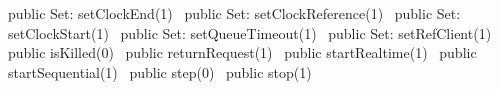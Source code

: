 public \LA{}Set: setClockEnd(1)~{\nwtagstyle{}}\RA{}
public \LA{}Set: setClockReference(1)~{\nwtagstyle{}}\RA{}
public \LA{}Set: setClockStart(1)~{\nwtagstyle{}}\RA{}
public \LA{}Set: setQueueTimeout(1)~{\nwtagstyle{}}\RA{}
public \LA{}Set: setRefClient(1)~{\nwtagstyle{}}\RA{}
public \LA{}isKilled(0)~{\nwtagstyle{}}\RA{}
public \LA{}returnRequest(1)~{\nwtagstyle{}}\RA{}
public \LA{}startRealtime(1)~{\nwtagstyle{}}\RA{}
public \LA{}startSequential(1)~{\nwtagstyle{}}\RA{}
public \LA{}step(0)~{\nwtagstyle{}}\RA{}
public \LA{}stop(1)~{\nwtagstyle{}}\RA{}
\nwendcode{}\nwdocspar

